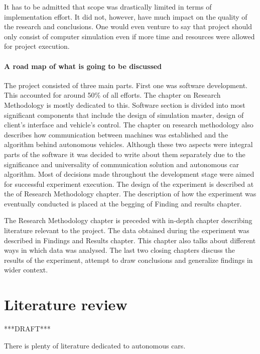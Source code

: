 \documentclass[11pt,english]{article}
\begin{document}
It has to be admitted that scope was drastically limited in terms of implementation effort. It did not, however, have much impact on the quality of the research and conclusions. One would even venture to say that project should only consist of computer simulation even if more time and resources were allowed for project execution. 

\paragraph{A road map of what is going to be discussed}

The project consisted of three main parts. First one was software development. This accounted for around 50\% of all efforts. The chapter on Research Methodology is mostly dedicated to this. Software section is divided into most significant components that include the design of simulation master, design of client's interface and vehicle's control. The chapter on research methodology also describes how communication between machines was established and the algorithm behind autonomous vehicles. Although these two aspects were integral parts of the software it was decided to write about them separately due to the significance and universality of communication solution and autonomous car algorithm. 
Most of decisions made throughout the development stage were aimed for successful experiment execution. The design of the experiment is described at the of Research Methodology chapter. The description of how the experiment was eventually conducted is placed at the begging of Finding and results chapter.


The Research Methodology chapter is preceded with in-depth chapter describing literature relevant to the project. The data obtained during the experiment was described in Findings and Results chapter. This chapter also talks about different ways in which data was analysed. The last two closing chapters discuss the results of the experiment, attempt to draw conclusions and generalize findings in wider context. 





\section{Literature review}

***DRAFT***

There is plenty of literature dedicated to autonomous cars. 
\end{document}
